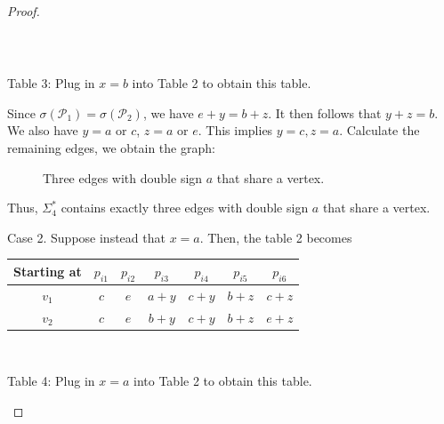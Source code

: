 \documentclass[12pt]{amsart}
\theoremstyle{plain}
\theoremstyle{definition}%
\begin{document}
\begin{proof}
\begin{center}
\begin{tabular}{||c| c| c |c| c |c |c||}
\end{tabular}\\

\end{center}
\begin{center}
   Table 3: Plug in $x=b$ into Table 2 to obtain this table.
\end{center}

Since $\sigma(\mathscr{P}_1)=\sigma(\mathscr{P}_2)$, we have $e+y=b+z$. It then follows that $y+z=b$. We also have $y=a$ or $c$, $z=a$ or $e$. This implies $y=c,z=a$. Calculate the remaining edges, we obtain the graph: 

\vspace{1cm}

\begin{figure}[h]
    \centering
{}
\caption{Three edges with double sign $a$ that share a vertex.}
    \label{all a1}
\end{figure}
\vspace{1cm}


Thus, $\Sigma_4^*$ contains exactly three edges with double sign 
$a$ that  share a vertex. 

Case 2. 
Suppose instead that $x=a$. Then, the table 2 becomes
\begin{center}
\begin{tabular}{||c| c| c |c| c |c |c||} 
 \hline
 Starting at & $p_{i1}$ & $p_{i2}$ & $p_{i3}$ &$p_{i4}$&$p_{i5}$&$p_{i6}$\\ [0.5ex] 
 \hline\hline
 $v_1$ & $c$ & $e$&$a+y$ &$c+y$& $b+z$&$c+z$ \\ 
 \hline
$ v_2$ & $c$ & $e$ & $b+y$&$c+y$&$b+z$&$e+z$ \\
 [1ex] 
 \hline
\end{tabular}\\
\end{center}
\begin{center}
Table 4: Plug in $x=a$ into Table 2 to obtain this table.
\end{center}



\end{proof}
\end{document}

